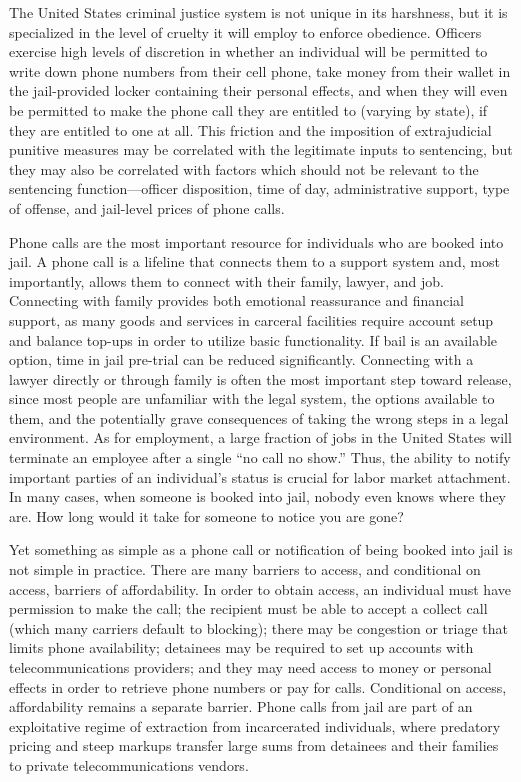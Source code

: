 \documentclass[12pt, a4paper]{article}
\begin{document}
The United States criminal justice system is not unique in its harshness, but it is specialized in the level of cruelty it will employ to enforce obedience. Officers exercise high levels of discretion in whether an individual will be permitted to write down phone numbers from their cell phone, take money from their wallet in the jail-provided locker containing their personal effects, and when they will even be permitted to make the phone call they are entitled to (varying by state), if they are entitled to one at all. This friction and the imposition of extrajudicial punitive measures may be correlated with the legitimate inputs to sentencing, but they may also be correlated with factors which should not be relevant to the sentencing function—officer disposition, time of day, administrative support, type of offense, and jail-level prices of phone calls.

Phone calls are the most important resource for individuals who are booked into jail. A phone call is a lifeline that connects them to a support system and, most importantly, allows them to connect with their family, lawyer, and job. Connecting with family provides both emotional reassurance and financial support, as many goods and services in carceral facilities require account setup and balance top-ups in order to utilize basic functionality. If bail is an available option, time in jail pre-trial can be reduced significantly. Connecting with a lawyer directly or through family is often the most important step toward release, since most people are unfamiliar with the legal system, the options available to them, and the potentially grave consequences of taking the wrong steps in a legal environment. As for employment, a large fraction of jobs in the United States will terminate an employee after a single “no call no show.” Thus, the ability to notify important parties of an individual’s status is crucial for labor market attachment. In many cases, when someone is booked into jail, nobody even knows where they are. How long would it take for someone to notice you are gone?

Yet something as simple as a phone call or notification of being booked into jail is not simple in practice. There are many barriers to access, and conditional on access, barriers of affordability. In order to obtain access, an individual must have permission to make the call; the recipient must be able to accept a collect call (which many carriers default to blocking); there may be congestion or triage that limits phone availability; detainees may be required to set up accounts with telecommunications providers; and they may need access to money or personal effects in order to retrieve phone numbers or pay for calls. Conditional on access, affordability remains a separate barrier. Phone calls from jail are part of an exploitative regime of extraction from incarcerated individuals, where predatory pricing and steep markups transfer large sums from detainees and their families to private telecommunications vendors. 
\end{document}
